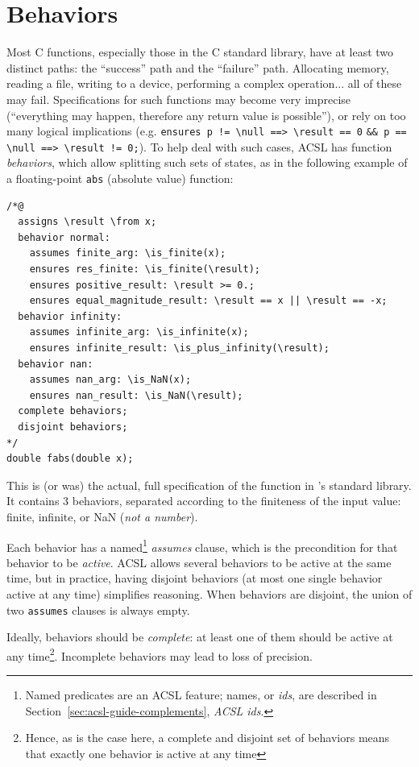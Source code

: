 \documentclass[web]{frama-c-book}
\begin{document}
\section{Behaviors}

Most C functions, especially those in the C standard library, have at least
two distinct paths: the ``success'' path and the ``failure'' path.
Allocating memory, reading a file, writing to a device, performing a
complex operation... all of these may fail. Specifications for such functions
may become very imprecise (``everything may happen, therefore any return value
is possible''), or rely on too many logical implications (e.g.
\verb+ensures p != \null ==> \result == 0+ \verb+&& p == \null ==> \result != 0;+).
To help deal with such cases, ACSL has function {\em behaviors}, which allow
splitting such sets of states, as in the following example of a floating-point
\texttt{abs} (absolute value) function:

\begin{lstlisting}
/*@
  assigns \result \from x;
  behavior normal:
    assumes finite_arg: \is_finite(x);
    ensures res_finite: \is_finite(\result);
    ensures positive_result: \result >= 0.;
    ensures equal_magnitude_result: \result == x || \result == -x;
  behavior infinity:
    assumes infinite_arg: \is_infinite(x);
    ensures infinite_result: \is_plus_infinity(\result);
  behavior nan:
    assumes nan_arg: \is_NaN(x);
    ensures nan_result: \is_NaN(\result);
  complete behaviors;
  disjoint behaviors;
*/
double fabs(double x);
\end{lstlisting}

This is (or was) the actual, full specification of the function in \FramaC's
standard library. It contains 3 behaviors, separated according to the
finiteness of the input value: finite, infinite, or NaN ({\em not a number}).

Each behavior has a named\footnote{Named predicates are an ACSL feature; names,
or {\em ids}, are described in Section~\ref{sec:acsl-guide-complements},
{\em ACSL ids}.} {\em assumes} clause, which is the precondition for
that behavior to be {\em active}. ACSL allows several behaviors to be active
at the same time, but in practice, having disjoint behaviors (at most one single
behavior active at any time) simplifies reasoning. When behaviors are disjoint,
the union of two \texttt{assumes} clauses is always empty.

Ideally, behaviors should be {\em complete}: at least one of them should be
active at any time\footnote{Hence, as is the case here, a complete and disjoint set
of behaviors means that exactly one behavior is active at any time}.
Incomplete behaviors may lead to loss of precision.
\end{document}
